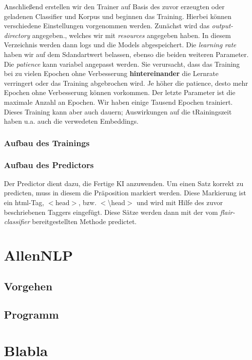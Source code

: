 \documentclass[10pt,a4paper]{article}
\begin{document}
\begin{flushleft}
Anschließend erstellen wir den Trainer auf Basis des zuvor erzeugten oder geladenen Classifier und Korpus und beginnen das Training. Hierbei können verschiedene Einstellungen vorgenommen werden. Zunächst wird das \textit{output-directory} angegeben., welches wir mit \textit{resources} angegeben haben. In diesem Verzeichnis werden dann logs und die Models abgespeichert. Die \textit{learning rate} haben wir auf dem Sdandartwert belassen, ebenso die beiden weiteren Parameter. Die \textit{patience} kann variabel angepasst werden. Sie verursacht, dass das Training bei zu vielen Epochen ohne Verbesserung \textbf{hintereinander} die Lernrate verringert oder das Training abgebrochen wird. Je höher die patience, desto mehr Epochen ohne Verbesserung können vorkommen. Der letzte Parameter ist die maximale Anzahl an Epochen. Wir haben einige Tausend Epochen trainiert. Dieses Training kann aber auch dauern; Auswirkungen auf die tRainingszeit haben u.a. auch die verwedeten Embeddings.
\end{flushleft}

\subsubsection{Aufbau des Trainings}
\begin{flushleft}

\end{flushleft}

\subsubsection{Aufbau des Predictors}
\begin{flushleft}
Der Predictor dient dazu, die Fertige KI anzuwenden. Um einen Satz korrekt zu predicten, muss in diesem die Präposition markiert werden. Diese Markierung ist ein html-Tag, $<$head$>$, bzw. $<$\textbackslash head$>$ und wird mit Hilfe des zuvor beschriebenen Taggers eingefügt. Diese Sätze werden dann mit der vom \textit{flair-classifier} bereitgestellten Methode predictet.
\end{flushleft}

\newpage

\section{AllenNLP}

\subsection{Vorgehen}

\subsection{Programm}

\newpage

\section{Blabla}
\end{document}
